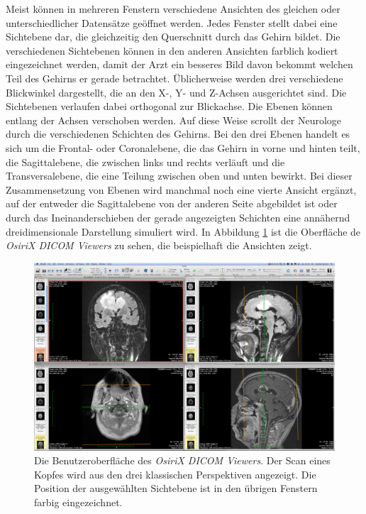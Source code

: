 Meist können in mehreren Fenstern verschiedene Ansichten des gleichen oder unterschiedlicher Datensätze geöffnet werden. Jedes Fenster stellt dabei eine Sichtebene dar, die gleichzeitig den Querschnitt durch das Gehirn bildet. Die verschiedenen Sichtebenen können in den anderen Ansichten farblich kodiert eingezeichnet werden, damit der Arzt ein besseres Bild davon bekommt welchen Teil des Gehirns er gerade betrachtet.
Üblicherweise werden drei verschiedene Blickwinkel dargestellt, die an den X-, Y- und Z-Achsen ausgerichtet sind. Die Sichtebenen verlaufen dabei orthogonal zur Blickachse. Die Ebenen können entlang der Achsen verschoben werden. Auf diese Weise scrollt der Neurologe durch die verschiedenen Schichten des Gehirns. 
Bei den drei Ebenen handelt es sich um die Frontal- oder Coronalebene, die das Gehirn in vorne und hinten teilt, die Sagittalebene, die zwischen links und rechts verläuft und die Transversalebene, die eine Teilung zwischen oben und unten bewirkt.  
Bei dieser Zusammensetzung von Ebenen wird manchmal noch eine vierte Ansicht ergänzt, auf der entweder die Sagittalebene von der anderen Seite abgebildet ist oder durch das Ineinanderschieben der gerade angezeigten Schichten eine annähernd dreidimensionale Darstellung simuliert wird. 
In Abbildung \ref{img:mrtSoftware} ist die Oberfläche de \textit{OsiriX DICOM Viewers} zu sehen, die beispielhaft die Ansichten zeigt.

\begin{figure}[!htb]
	\centering
	\includegraphics[width=0.7\linewidth]{images/osirix.jpg}
	\caption{Die Benutzeroberfläche des \textit{OsiriX DICOM Viewers}. Der Scan eines Kopfes wird aus den drei klassischen Perspektiven angezeigt. Die Position der ausgewählten Sichtebene ist in den übrigen Fenstern farbig eingezeichnet.}
	\label{img:mrtSoftware}
\end{figure}
\FloatBarrier


